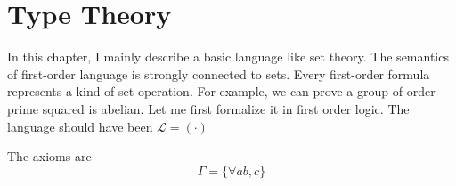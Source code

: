 \chapter{Type Theory}
\label{type-theory}

In this chapter, I mainly describe a basic language like set theory.
The semantics of first-order language is strongly connected to sets.
Every first-order formula represents a kind of set operation.
For example, we can prove a group of order prime squared is abelian.
Let me first formalize it in first order logic. The language should
have been $\mathscr{L}=(\cdot)$

The axioms are
$$
\Gamma = \{
    \forall a b, c
\}
$$